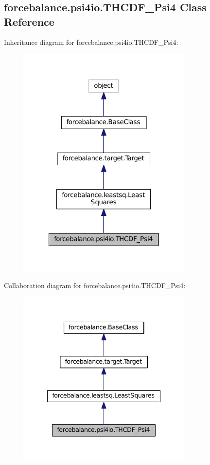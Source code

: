 \hypertarget{classforcebalance_1_1psi4io_1_1THCDF__Psi4}{\subsection{forcebalance.\-psi4io.\-T\-H\-C\-D\-F\-\_\-\-Psi4 Class Reference}
\label{classforcebalance_1_1psi4io_1_1THCDF__Psi4}
}


Inheritance diagram for forcebalance.\-psi4io.\-T\-H\-C\-D\-F\-\_\-\-Psi4\-:
\nopagebreak
\begin{figure}[H]
\begin{center}
\leavevmode
\includegraphics[width=248pt]{classforcebalance_1_1psi4io_1_1THCDF__Psi4__inherit__graph}
\end{center}
\end{figure}


Collaboration diagram for forcebalance.\-psi4io.\-T\-H\-C\-D\-F\-\_\-\-Psi4\-:
\nopagebreak
\begin{figure}[H]
\begin{center}
\leavevmode
\includegraphics[width=248pt]{classforcebalance_1_1psi4io_1_1THCDF__Psi4__coll__graph}
\end{center}
\end{figure}
